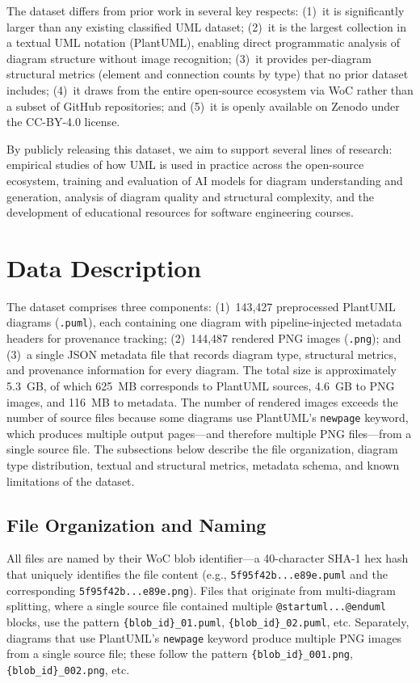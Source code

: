 \documentclass[11pt]{article}
\begin{document}
The dataset differs from prior work in several key respects: (1)~it is significantly larger than any existing classified UML dataset; (2)~it is the largest collection in a textual UML notation (PlantUML), enabling direct programmatic analysis of diagram structure without image recognition; (3)~it provides per-diagram structural metrics (element and connection counts by type) that no prior dataset includes; (4)~it draws from the entire open-source ecosystem via WoC rather than a subset of GitHub repositories; and (5)~it is openly available on Zenodo under the CC-BY-4.0 license.

By publicly releasing this dataset, we aim to support several lines of research: empirical studies of how UML is used in practice across the open-source ecosystem, training and evaluation of AI models for diagram understanding and generation, analysis of diagram quality and structural complexity, and the development of educational resources for software engineering courses.

\section{Data Description}
\label{sec:data-description}

The dataset comprises three components: (1)~143,427 preprocessed PlantUML diagrams (\texttt{.puml}), each containing one diagram with pipeline-injected metadata headers for provenance tracking; (2)~144,487 rendered PNG images (\texttt{.png}); and (3)~a single JSON metadata file that records diagram type, structural metrics, and provenance information for every diagram. The total size is approximately 5.3~GB, of which 625~MB corresponds to PlantUML sources, 4.6~GB to PNG images, and 116~MB to metadata. The number of rendered images exceeds the number of source files because some diagrams use PlantUML's \texttt{newpage} keyword, which produces multiple output pages---and therefore multiple PNG files---from a single source file. The subsections below describe the file organization, diagram type distribution, textual and structural metrics, metadata schema, and known limitations of the dataset.

\subsection{File Organization and Naming}
\label{sec:file-naming}

All files are named by their WoC blob identifier---a 40-character SHA-1 hex hash that uniquely identifies the file content (e.g., \texttt{5f95f42b...e89e.puml} and the corresponding \texttt{5f95f42b...e89e.png}). Files that originate from multi-diagram splitting, where a single source file contained multiple \texttt{@startuml...@enduml} blocks, use the pattern \texttt{\{blob\_id\}\_01.puml}, \texttt{\{blob\_id\}\_02.puml}, etc. Separately, diagrams that use PlantUML's \texttt{newpage} keyword produce multiple PNG images from a single source file; these follow the pattern \texttt{\{blob\_id\}\_001.png}, \texttt{\{blob\_id\}\_002.png}, etc.
\end{document}
